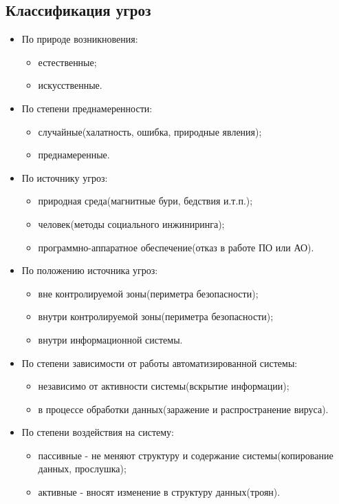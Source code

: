 \documentclass{article}
\begin{document}
\subsection{Классификация угроз}
\begin{itemize}
\item По природе возникновения:
\begin{itemize}
\item естественные;
\item искусственные.
\end{itemize}
\item По степени преднамеренности:
\begin{itemize}
\item случайные(халатность, ошибка, природные явления);
\item преднамеренные.
\end{itemize}
\item По источнику угроз:
\begin{itemize}
\item природная среда(магнитные бури, бедствия и.т.п.);
\item человек(методы социального инжиниринга);
\item программно-аппаратное обеспечение(отказ в работе ПО или АО).
\end{itemize}
\item По положению источника угроз:
\begin{itemize}
\item вне контролируемой зоны(периметра безопасности);
\item внутри контролируемой зоны(периметра безопасности);
\item внутри информационной системы.
\end{itemize}
\item По степени зависимости от работы автоматизированной системы:
\begin{itemize}
\item независимо от активности системы(вскрытие информации);
\item в процессе обработки данных(заражение и распространение вируса).
\end{itemize}
\item По степени воздействия на систему:
\begin{itemize}
\item пассивные - не меняют структуру и содержание системы(копирование данных, прослушка);
\item активные - вносят изменение в структуру данных(троян).

\end{itemize}
\end{itemize}
\end{document}
